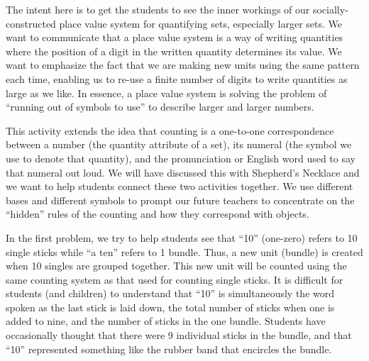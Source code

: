 \documentclass[nooutcomes,noauthor,handout]{ximera}
\begin{document}
\newpage
\begin{instructorNotes}
The intent here is to get the students to see the inner workings of our socially-constructed place value system for quantifying sets, especially larger sets. We want to communicate that a place value system is a way of writing quantities where the position of a digit in the written quantity determines its value. We want to emphasize the fact that we are making new units using the same pattern each time, enabling us to re-use a finite number of digits to write quantities as large as we like. In essence, a place value system is solving the problem of ``running out of symbols to use'' to describe larger and larger numbers.  

This activity extends the idea that counting is a one-to-one correspondence between a number (the quantity attribute of a set), its numeral (the symbol we use to denote that quantity), and the pronunciation or English word used to say that numeral out loud. We will have discussed this with Shepherd's Necklace and we want to help students connect these two activities together. We use different bases and different symbols to prompt our future teachers to concentrate on the ``hidden'' rules of the counting and how they correspond with objects.

In the first problem, we try to help students see that ``10'' (one-zero) refers to 10 single sticks while ``a ten'' refers to 1 bundle.  Thus, a new unit (bundle) is created when 10 singles are grouped together.  This new unit will be counted using the same counting system as that used for counting single sticks.  It is difficult for students (and children) to understand that ``10'' is simultaneously the word spoken as the last stick is laid down, the total number of sticks when one is added to nine, and the number of sticks in the one bundle.  Students have occasionally thought that there were 9 individual sticks in the bundle, and that ``10'' represented something like the rubber band that encircles the bundle.


\end{instructorNotes}
\end{document}
